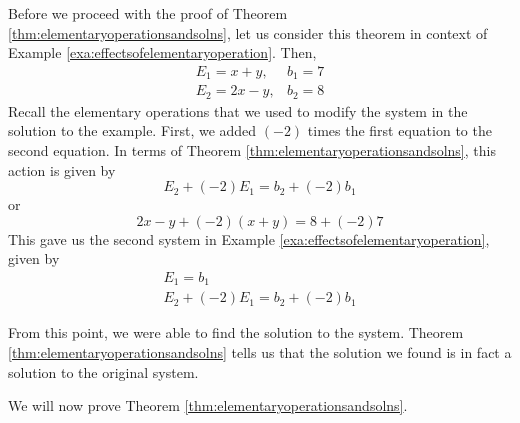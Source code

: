 Before we proceed with the proof of Theorem \ref{thm:elementaryoperationsandsolns}, 
let us consider this theorem in context of Example \ref{exa:effectsofelementaryoperation}. Then,
\begin{equation*}
\begin{array}{cc}
E_{1} = x+y, & b_{1} = 7 \\
E_{2} = 2x-y, & b_{2} = 8 
\end{array}
\end{equation*}
Recall the elementary operations that we used to modify the system in the solution to the example. 
First, we added $\left( -2 \right)$ times the first equation to the second equation.
In terms of Theorem \ref{thm:elementaryoperationsandsolns}, this action is given by
\begin{equation*}
E_{2} + \left( -2 \right) E_{1} = b_{2} + \left( -2 \right)b_{1}
\end{equation*}
or
\begin{equation*}
2x-y + \left( -2 \right) \left(x+y \right) = 8 + \left( -2 \right) 7
\end{equation*}
This gave us the second system in Example \ref{exa:effectsofelementaryoperation}, given by 
\begin{equation*}
\begin{array}{c}
E_{1} = b_{1} \\
E_{2} + \left( -2 \right) E_{1} = b_{2} + \left( -2 \right) b_{1}
\end{array}
\end{equation*}

From this point, we were able to 
find the solution to the system. Theorem \ref{thm:elementaryoperationsandsolns} tells us that the solution we 
found is in fact a solution to the original system.

\ifdefined\showproofs
We will now prove Theorem \ref{thm:elementaryoperationsandsolns}.

